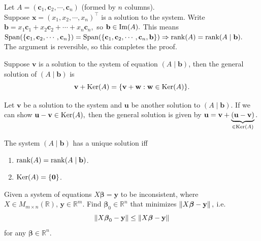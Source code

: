 \documentclass[12pt]{article}
\begin{document}
\begin{pfbox}
    Let $A=(\mathbf{c}_1,\mathbf{c}_2,\cdots,\mathbf{c}_n)$ (formed by $n$ columns).\\
    Suppose $\mathbf{x}=(x_1,x_2,\cdots,x_n)^\top$ is a solution to the system. Write $\mathbf{b}=x_1\mathbf{c}_1+x_2\mathbf{c}_2+\cdots +x_n\mathbf{c}_n,$ so $\mathbf{b}\in\operatorname{Im}(A).$
    This means $\mathrm{Span}(\{\mathbf{c}_1,\mathbf{c}_2,\cdots,\mathbf{c}_n\})=\mathrm{Span}(\{\mathbf{c}_1,\mathbf{c}_2,\cdots,\mathbf{c}_n,\mathbf{b}\})\Rightarrow \operatorname{rank}(A)=\operatorname{rank}(A\mid \mathbf{b}).$\\
    The argument is reversible, so this completes the proof.
\end{pfbox}

\begin{theorem}
Suppose $\mathbf{v}$ is a solution to the system of equation $(A\mid \mathbf{b})$,
then the general solution of $(A\mid \mathbf{b})$ is
\[\mathbf{v}+\operatorname{Ker}(A)=\{\mathbf{v}+\mathbf{w}:\mathbf{w}\in \operatorname{Ker}(A)\}.\]
\end{theorem}

\begin{pfbox}
Let $\mathbf{v}$ be a solution to the system and $\mathbf{u}$ be another solution to $(A\mid \mathbf{b}).$
If we can show $\mathbf{u}-\mathbf{v}\in\operatorname{Ker}(A),$ then the general solution is given by $\mathbf{u}=\mathbf{v}+\underbrace{(\mathbf{u}-\mathbf{v})}_{\in\operatorname{Ker}(A)}.$
\end{pfbox}

\begin{corollary}
    The system $(A\mid\mathbf{b})$ has a unique solution iff
    \begin{enumerate}
        \item $\operatorname{rank}(A)=\operatorname{rank}(A\mid\mathbf{b})$.
        \item $\operatorname{Ker}(A)=\{\mathbf{0}\}$.
    \end{enumerate}
\end{corollary}

\begin{gbox}
\begin{question}
    Given a system of equations $X\boldsymbol{\beta}=\mathbf{y}$ to be inconsistent, where $X\in M_{m\times n}(\mathbb{R}),\, \mathbf{y}\in \mathbb{R}^m$. Find $\boldsymbol{\beta}_0\in\mathbb{R}^n$ that minimizes $\left\lVert X\boldsymbol{\beta}-\mathbf{y} \right\rVert,$ i.e.
    $$\left\lVert X\boldsymbol{\beta}_0-\mathbf{y} \right\rVert\le\left\lVert X\boldsymbol{\beta}-\mathbf{y} \right\rVert$$ 
    for any $\boldsymbol{\beta}\in\mathbb{R}^n.$
\end{question}
\end{gbox}
\end{document}
